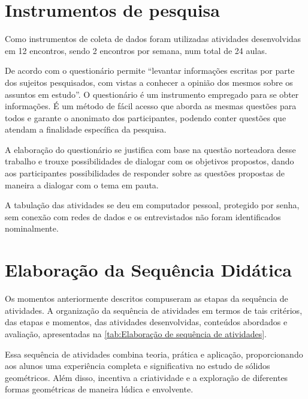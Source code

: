 \section{Instrumentos de pesquisa}

Como instrumentos de coleta de dados foram utilizadas atividades desenvolvidas em 12 encontros, sendo 2 encontros por semana, num total de 24 aulas.

De acordo com  o questionário permite ``levantar
informações escritas por parte dos sujeitos pesquisados, com vistas a conhecer a opinião dos mesmos sobre os assuntos em estudo''. O questionário é um instrumento empregado para se obter informações. É um método de fácil acesso que aborda as mesmas questões para todos e garante o anonimato dos participantes, podendo conter questões que atendam a finalidade específica da pesquisa.

A elaboração do questionário se justifica com base na questão norteadora desse trabalho e trouxe possibilidades de dialogar com os objetivos propostos, dando aos participantes possibilidades de responder sobre as questões propostas de maneira a dialogar com o tema em pauta.

A tabulação das atividades se deu em computador pessoal, protegido por senha, sem conexão com redes de dados e os entrevistados não foram identificados nominalmente.

\section{Elaboração da Sequência Didática}

Os momentos anteriormente descritos compuseram as etapas da sequência de atividades. A organização da sequência de atividades em termos de tais critérios, das etapas e momentos, das atividades desenvolvidas, conteúdos abordados e avaliação, apresentadas na \autoref{tab:Elaboração de sequência de atividades}.

Essa sequência de atividades combina teoria, prática e aplicação, proporcionando aos alunos uma experiência completa e significativa no estudo de sólidos geométricos. Além disso, incentiva a criatividade e a exploração de diferentes formas geométricas de maneira lúdica e envolvente.

